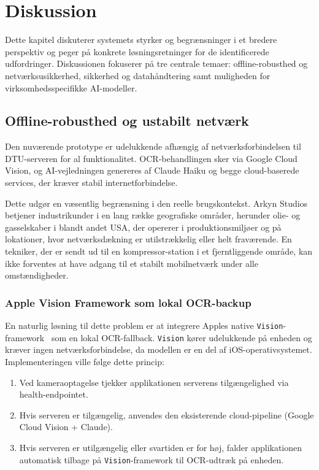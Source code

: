 \chapter{Diskussion}
\label{chap:discussion}

Dette kapitel diskuterer systemets styrker og begrænsninger i et bredere perspektiv og peger på konkrete løsningsretninger for de identificerede udfordringer. Diskussionen fokuserer på tre centrale temaer: offline-robusthed og netværksusikkerhed, sikkerhed og datahåndtering samt muligheden for virksomhedsspecifikke AI-modeller.

\section{Offline-robusthed og ustabilt netværk}
\label{sec:offline}

Den nuværende prototype er udelukkende afhængig af netværksforbindelsen til DTU-serveren for al funktionalitet. OCR-behandlingen sker via Google Cloud Vision, og AI-vejledningen genereres af Claude Haiku og begge cloud-baserede services, der kræver stabil internetforbindelse.

Dette udgør en væsentlig begrænsning i den reelle brugskontekst. Arkyn Studios betjener industrikunder i en lang række geografiske områder, herunder olie- og gasselskaber i blandt andet USA, der opererer i produktionsmiljøer og på lokationer, hvor netværksdækning er utilstrækkelig eller helt fraværende. En tekniker, der er sendt ud til en kompressor-station i et fjerntliggende område, kan ikke forventes at have adgang til et stabilt mobilnetværk under alle omstændigheder.

\subsection{Apple Vision Framework som lokal OCR-backup}
\label{subsec:apple-vision}

En naturlig løsning til dette problem er at integrere Apples native \texttt{Vision}-framework~\cite{apple_vision} som en lokal OCR-fallback. \texttt{Vision} kører udelukkende på enheden og kræver ingen netværksforbindelse, da modellen er en del af iOS-operativsystemet. Implementeringen ville følge dette princip:

\begin{enumerate}
  \item Ved kameraoptagelse tjekker applikationen serverens tilgængelighed via health-endpointet.
  \item Hvis serveren er tilgængelig, anvendes den eksisterende cloud-pipeline (Google Cloud Vision + Claude).
  \item Hvis serveren er utilgængelig eller svartiden er for høj, falder applikationen automatisk tilbage på \texttt{Vision}-framework til OCR-udtræk på enheden.
\end{enumerate}

